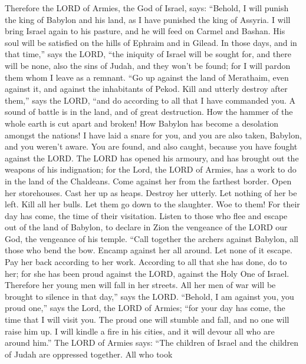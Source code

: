  Therefore the LORD of Armies, the God of Israel, says:
``Behold, I will punish the king of Babylon and his land, as I have
punished the king of Assyria.  I will bring Israel again to
his pasture, and he will feed on Carmel and Bashan. His soul will be
satisfied on the hills of Ephraim and in Gilead.  In those
days, and in that time,'' says the LORD, ``the iniquity of Israel will
be sought for, and there will be none, also the sins of Judah, and they
won't be found; for I will pardon them whom I leave as a remnant.
 ``Go up against the land of Merathaim, even against it,
and against the inhabitants of Pekod. Kill and utterly destroy after
them,'' says the LORD, ``and do according to all that I have commanded
you.  A sound of battle is in the land, and of great
destruction.  How the hammer of the whole earth is cut
apart and broken! How Babylon has become a desolation amongst the
nations!  I have laid a snare for you, and you are also
taken, Babylon, and you weren't aware. You are found, and also caught,
because you have fought against the LORD.  The LORD has
opened his armoury, and has brought out the weapons of his indignation;
for the Lord, the LORD of Armies, has a work to do in the land of the
Chaldeans.  Come against her from the farthest border. Open
her storehouses. Cast her up as heaps. Destroy her utterly. Let nothing
of her be left.  Kill all her bulls. Let them go down to
the slaughter. Woe to them! For their day has come, the time of their
visitation.  Listen to those who flee and escape out of the
land of Babylon, to declare in Zion the vengeance of the LORD our God,
the vengeance of his temple.  ``Call together the archers
against Babylon, all those who bend the bow. Encamp against her all
around. Let none of it escape. Pay her back according to her work.
According to all that she has done, do to her; for she has been proud
against the LORD, against the Holy One of Israel. 
Therefore her young men will fall in her streets. All her men of war
will be brought to silence in that day,'' says the LORD. 
``Behold, I am against you, you proud one,'' says the Lord, the LORD of
Armies; ``for your day has come, the time that I will visit you.
 The proud one will stumble and fall, and no one will raise
him up. I will kindle a fire in his cities, and it will devour all who
are around him.''  The LORD of Armies says: ``The children
of Israel and the children of Judah are oppressed together. All who took
